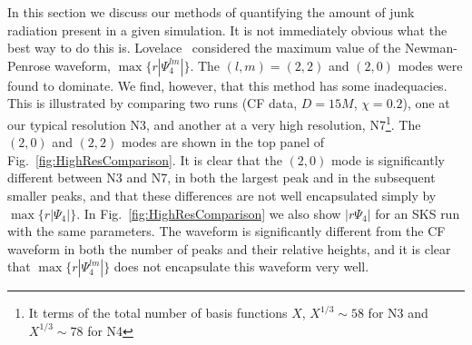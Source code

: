 \documentclass[aps,prd,amsmath,floatfix,twocolumn,superscriptaddress,nofootinbib,showpacs]{revtex4-1}
\theoremstyle{plain}
\theoremstyle{definition}
\newcommand{\red}[1]{\textcolor{Red}{#1}}
\newcommand{\note}[1]{\textcolor{Red}{[#1]}}
\begin{document}
In this section we discuss our methods of
quantifying the amount of junk radiation present in a given
simulation. It is not immediately obvious what the best way to do this
is.  Lovelace~\cite{Lovelace2009} considered the
maximum value of the Newman-Penrose waveform, $\max\{r|\Psi_4^{lm}|\}$.  The
  $(l,m)=(2,2)$ and $(2,0)$ modes were found to dominate. We find,
  however, that this method has some inadequacies. This is illustrated
  by comparing two runs (CF data, $D=15M$, $\chi=0.2$), one at our
  typical resolution N3, and another at a very high
  resolution, N7\footnote{It terms of the total number of basis
    functions $X$, $X^{1/3}\sim58$ for N3 and $X^{1/3}\sim78$ for
    N4}. The $(2,0)$ and $(2,2)$ modes are shown in the top panel of
  Fig.~\ref{fig:HighResComparison}. It is clear that the $(2,0)$ mode
  is significantly different between N3 and N7, in both the
  largest peak and in the subsequent smaller peaks, and that these
  differences are not well encapsulated simply by
  $\max\{r|\Psi_4|\}$. In Fig.~\ref{fig:HighResComparison} we also
  show $|r\Psi_4|$ for an SKS run with the same parameters. The
  waveform is significantly different from the CF waveform in both the
  number of peaks and their relative heights, and it is clear that
  $\max\{r|\Psi_4^{lm}|\}$ does not encapsulate this waveform very well.

\end{document}
